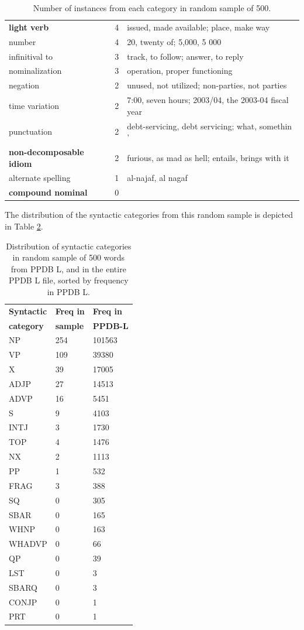 \documentclass[11pt]{article}
\begin{document}
\begin{center}
\begin{table}
\begin{tabular}{|l|l|l|}
\bf light verb & 4  &  issued, made available; place, make way \\
number & 4 & 20, twenty of; 5,000, 5 000\\
infinitival to & 3 & track, to follow; answer, to reply \\
nominalization & 3 &  operation, proper functioning \\
negation & 2 & unused, not utilized; non-parties, not parties  \\
time variation & 2 & 7:00, seven hours; 2003/04, the 2003-04 fiscal year\\
punctuation & 2 & debt-servicing, debt servicing; what, somethin '\\
\bf non-decomposable idiom & 2 & furious, as mad as hell; entails, brings with it\\
alternate spelling & 1 & al-najaf, al nagaf\\
\bf compound nominal & 0 &\\
\hline
\end{tabular}
\hfill{}
\caption{\label{font-table} Number of instances from each category in random sample of 500. }
\end{table}
\end{center}
The distribution of the syntactic categories from this random sample is depicted in Table \ref{sc-dist}. 

\begin{table}
\hfill{}
\begin{center}
\begin{tabular}{|l|l|l|}
\hline \bf Syntactic  & \bf Freq in  & \bf Freq in  \\ 
\bf  category & \bf sample & \bf PPDB-L \\ \hline
NP & 254 & 101563 \\
VP & 109 & 39380 \\
X & 39 & 17005 \\
ADJP & 27 & 14513 \\
ADVP & 16 & 5451 \\
S & 9 & 4103 \\
INTJ & 3 & 1730 \\
TOP & 4 & 1476 \\
NX & 2 & 1113 \\
PP & 1 & 532 \\
FRAG & 3 & 388  \\ 
SQ & 0 & 305 \\
SBAR & 0 & 165 \\
WHNP & 0 & 163 \\
WHADVP & 0 & 66 \\
QP & 0 & 39 \\
LST & 0 & 3 \\ 
SBARQ & 0 & 3 \\
CONJP & 0 & 1 \\
PRT & 0 & 1 \\
\hline
\end{tabular}
\end{center}
\caption{\label{sc-dist} Distribution of syntactic categories in random sample of 500 words from PPDB L, and in the entire PPDB L file, sorted by frequency in PPDB L. }
\end{table}
\end{document}
